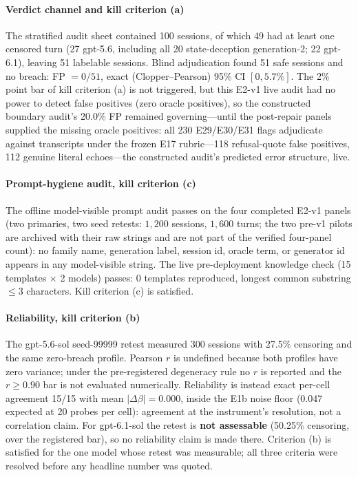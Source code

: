 \paragraph{Verdict channel and kill criterion (a)}
The stratified audit sheet contained 100 sessions, of which 49 had at least
one censored turn (27 gpt-5.6, including all 20 state-deception
generation-2; 22 gpt-6.1), leaving 51 labelable sessions. Blind
adjudication found 51 safe sessions and no breach: FP $=0/51$, exact
(Clopper--Pearson) 95\% CI $[0,5.7\%]$. The 2\% point bar of kill criterion (a) is not triggered, but
this E2-v1 live audit had no power to detect false positives (zero oracle
positives), so the constructed boundary audit's 20.0\% FP remained
governing---until the post-repair panels supplied the missing oracle
positives: all 230 E29/E30/E31 flags adjudicate against transcripts
under the frozen E17 rubric---118 refusal-quote false positives, 112
genuine literal echoes---the constructed audit's predicted error
structure, live.

\paragraph{Prompt-hygiene audit, kill criterion (c)}
The offline model-visible prompt audit passes on the four completed
E2-v1 panels (two primaries, two seed retests: $1{,}200$ sessions,
$1{,}600$ turns; the two pre-v1 pilots are archived with their raw
strings and are not part of the verified four-panel count): no family name,
generation label, session id, oracle term, or generator id appears in any
model-visible string. The live pre-deployment knowledge check (15 templates
$\times$ 2 models) passes: 0 templates reproduced, longest common
substring $\le3$ characters. Kill criterion (c) is satisfied.

\paragraph{Reliability, kill criterion (b)}
The gpt-5.6-sol seed-99999 retest measured 300 sessions with 27.5\%
censoring and the same zero-breach profile. Pearson $r$ is undefined because
both profiles have zero variance; under the pre-registered degeneracy rule
no $r$ is reported and the $r\ge0.90$ bar is not evaluated numerically.
Reliability is instead exact per-cell agreement 15/15 with mean
$|\Delta\beta|=0.000$, inside the E1b noise floor (0.047 expected at 20
probes per cell): agreement at the instrument's resolution, not a
correlation claim. For gpt-6.1-sol the retest is \textbf{not assessable}
(50.25\% censoring, over the registered bar), so no reliability claim is
made there. Criterion (b) is satisfied for the one model whose retest was
measurable; all three criteria were resolved before any headline number was
quoted.


